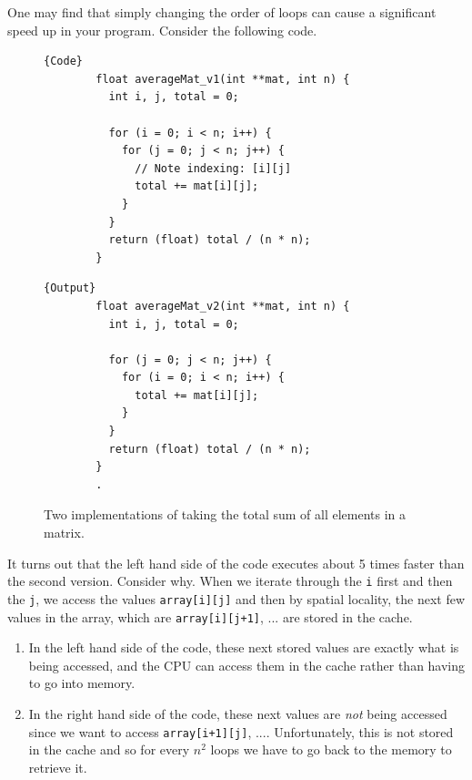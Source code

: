   \begin{example}
    One may find that simply changing the order of loops can cause a significant speed up in your program. Consider the following code. 
    \begin{figure}[H]
      \centering 
      \noindent\begin{minipage}{.5\textwidth}
      \begin{lstlisting}[]{Code}
        float averageMat_v1(int **mat, int n) {
          int i, j, total = 0;

          for (i = 0; i < n; i++) {
            for (j = 0; j < n; j++) {
              // Note indexing: [i][j]
              total += mat[i][j];
            }
          }
          return (float) total / (n * n);
        }
      \end{lstlisting}
      \end{minipage}
      \hfill
      \begin{minipage}{.49\textwidth}
      \begin{lstlisting}[]{Output}
        float averageMat_v2(int **mat, int n) {
          int i, j, total = 0;

          for (j = 0; j < n; j++) {
            for (i = 0; i < n; i++) {
              total += mat[i][j];
            }
          }
          return (float) total / (n * n);
        }
        .
      \end{lstlisting}
      \end{minipage}
      \caption{Two implementations of taking the total sum of all elements in a matrix.} 
      \label{fig:matrix_sum}
    \end{figure}
    It turns out that the left hand side of the code executes about 5 times faster than the second version. Consider why. When we iterate through the \texttt{i} first and then the \texttt{j}, we access the values \texttt{array[i][j]} and then by spatial locality, the next few values in the array, which are \texttt{array[i][j+1]}, ... are stored in the cache. 
    \begin{enumerate}
      \item In the left hand side of the code, these next stored values are exactly what is being accessed, and the CPU can access them in the cache rather than having to go into memory. 
      \item In the right hand side of the code, these next values are \textit{not} being accessed since we want to access \texttt{array[i+1][j]}, .... Unfortunately, this is not stored in the cache and so for every $n^2$ loops we have to go back to the memory to retrieve it. 
    \end{enumerate}
  \end{example}

